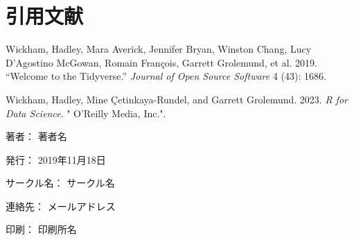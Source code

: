 \documentclass[
  b5paper,
  xelatex, ja=standard]{bxjsbook}
\newlength{\cslhangindent}
\newenvironment{CSLReferences}[2] %
 {\begin{list}{}{%
  \setlength{\itemindent}{0pt}
  \setlength{\leftmargin}{0pt}
  \setlength{\parsep}{0pt}
  \ifodd #1
   \setlength{\leftmargin}{\cslhangindent}
   \setlength{\itemindent}{-1\cslhangindent}
  \fi
  \setlength{\itemsep}{#2\baselineskip}}}
 {\end{list}}
\begin{document}

\chapter*{引用文献}\label{ux5f15ux7528ux6587ux732e}


\label{refs}
\begin{CSLReferences}{1}{0}
Wickham, Hadley, Mara Averick, Jennifer Bryan, Winston Chang, Lucy
D'Agostino McGowan, Romain François, Garrett Grolemund, et al. 2019.
{``Welcome to the Tidyverse.''} \emph{Journal of Open Source Software} 4
(43): 1686.

Wickham, Hadley, Mine Çetinkaya-Rundel, and Garrett Grolemund. 2023.
\emph{R for Data Science}. " O'Reilly Media, Inc.".

\end{CSLReferences}



\clearpage
{}
\begin{flushright}
\begin{minipage}{0.5\hsize}
\begin{description}
  \item{著者：} 著者名
  \item{発行：} 2019年11月18日
  \item{サークル名：} サークル名
  \item{連絡先：} メールアドレス
  \item{印刷：} 印刷所名
\end{description}
\end{minipage}
\end{flushright}
\clearpage
\end{document}
